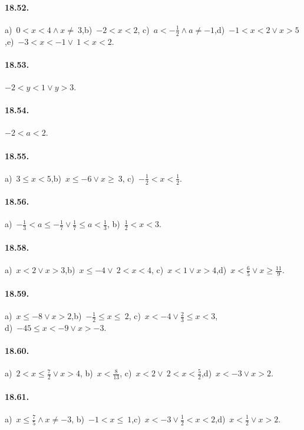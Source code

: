 \paragraph{18.52.} a)~$0<x<4\wedge x\neq~3$,\quad b)~$-2<x<2$,\quad
c)~$a<-{\frac{1}{2}}\wedge a\neq -1$,\quad d)~$-1<x<2\vee x>5$,\quad e)~$-3<x<-1\vee~1<x<2$.

\paragraph{18.53.} $-2<y<1\vee y>3$.

\paragraph{18.54.} $-2<a<2$.

\paragraph{18.55.} a)~$3\le x<5$,\quad b)~$x\le -6\vee x\ge~3$,\quad
c)~$-{\frac{1}{2}}<x<\frac{1}{2}$.

\paragraph{18.56.} a)~$-{\frac{1}{3}}<a\le -{\frac{1}{7}}\vee \frac{1}{7}\le a<\frac{1}{3}$,\quad
b)~$\frac{1}{2}<x<3$.

\paragraph{18.58.} a)~$x<2\vee x>3$,\quad b)~$x\le -4\vee~2<x<4$,\quad
c)~$x<1\vee x>4$,\quad d)~$x<\frac{6}{5}\vee x\ge\frac{11}{9}$.

\paragraph{18.59.} a)~$x\le -8\vee x>2$,\quad b)~$-{\frac{1}{2}}\le x\le~2$,\quad
c)~$x<-4\vee\frac{2}{3}\le x<3$,\quad \protect\\ d)~$-45\le x<-9\vee x>-3$.

\paragraph{18.60.} a)~$2<x\le \frac{7}{2}\vee x>4$,\quad
b)~$x<\frac{8}{13}$,\quad
c)~$x<2\vee~2<x<\frac{5}{2}$,\quad d)~$x<-3\vee x>2$.

\paragraph{18.61.} a)~$x\le \frac{7}{5}\wedge x\neq-3$,\quad
b)~$-1<x\le~1$,\quad c)~$x<-3\vee\frac{1}{2}<x<2$,\quad d)~$x<\frac{1}{2}\vee x>2$.

